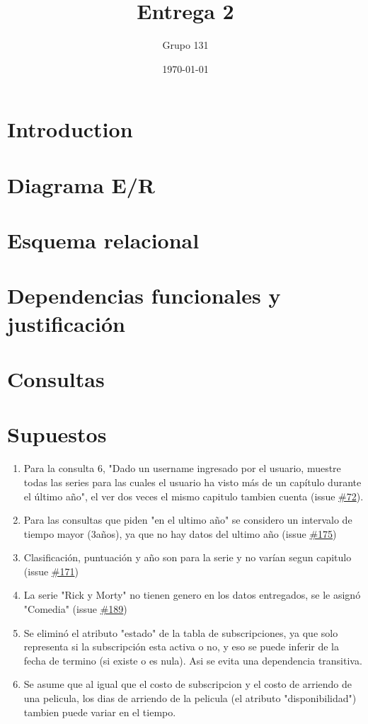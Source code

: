 \documentclass{article}
\title{Entrega 2}
\author{Grupo 131}
\date{\today}
\begin{document}
\maketitle

\section{Introduction}

\section{Diagrama E/R}

\section{Esquema relacional}

\section{Dependencias funcionales y justificación}

\section{Consultas}

\section{Supuestos}
\begin{enumerate}
    \item Para la consulta 6, "Dado un username ingresado por el usuario, muestre todas las series para las cuales el usuario ha visto más de un capítulo durante el último año", el ver dos veces el mismo capitulo tambien cuenta (issue \href{https://github.com/IIC2413/Syllabus-2023-2/issues/172}{\#72}).
    \item Para las consultas que piden "en el ultimo año" se considero un intervalo de tiempo mayor (3años), ya que no hay datos del ultimo año (issue \href{https://github.com/IIC2413/Syllabus-2023-2/issues/175}{\#175})
    \item Clasificación, puntuación y año son para la serie y no varían segun capitulo (issue \href{https://github.com/IIC2413/Syllabus-2023-2/issues/171}{\#171})
    \item La serie "Rick  y Morty" no tienen genero en los datos entregados, se le asignó "Comedia" (issue \href{https://github.com/IIC2413/Syllabus-2023-2/issues/189}{\#189})
    \item Se eliminó el atributo "estado" de la tabla de subscripciones, ya que solo representa si la subscripción esta activa o no, y eso se puede inferir de la fecha de termino (si existe o es nula). Asi se evita una dependencia transitiva.
    \item Se asume que al igual que el costo de subscripcion y el costo de arriendo de una pelicula, los dias de arriendo de la pelicula (el atributo "disponibilidad") tambien puede variar en el tiempo.
\end{enumerate}
\end{document}
